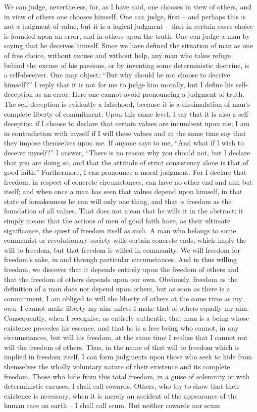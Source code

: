 \documentclass[12pt]{article}
\begin{document}
We can judge, nevertheless, for, as I have said, one chooses in view of others, and in view of others one chooses himself. One can judge, first – and perhaps this is not a judgment of value, but it is a logical judgment – that in certain cases choice is founded upon an error, and in others upon the truth. One can judge a man by saying that he deceives himself. Since we have defined the situation of man as one of free choice, without excuse and without help, any man who takes refuge behind the excuse of his passions, or by inventing some deterministic doctrine, is a self-deceiver. One may object: “But why should he not choose to deceive himself?” I reply that it is not for me to judge him morally, but I define his self-deception as an error. Here one cannot avoid pronouncing a judgment of truth. The self-deception is evidently a falsehood, because it is a dissimulation of man’s complete liberty of commitment. Upon this same level, I say that it is also a self-deception if I choose to declare that certain values are incumbent upon me; I am in contradiction with myself if I will these values and at the same time say that they impose themselves upon me. If anyone says to me, “And what if I wish to deceive myself?” I answer, “There is no reason why you should not, but I declare that you are doing so, and that the attitude of strict consistency alone is that of good faith.” Furthermore, I can pronounce a moral judgment. For I declare that freedom, in respect of concrete circumstances, can have no other end and aim but itself; and when once a man has seen that values depend upon himself, in that state of forsakenness he can will only one thing, and that is freedom as the foundation of all values. That does not mean that he wills it in the abstract: it simply means that the actions of men of good faith have, as their ultimate significance, the quest of freedom itself as such. A man who belongs to some communist or revolutionary society wills certain concrete ends, which imply the will to freedom, but that freedom is willed in community. We will freedom for freedom’s sake, in and through particular circumstances. And in thus willing freedom, we discover that it depends entirely upon the freedom of others and that the freedom of others depends upon our own. Obviously, freedom as the definition of a man does not depend upon others, but as soon as there is a commitment, I am obliged to will the liberty of others at the same time as my own. I cannot make liberty my aim unless I make that of others equally my aim. Consequently, when I recognise, as entirely authentic, that man is a being whose existence precedes his essence, and that he is a free being who cannot, in any circumstances, but will his freedom, at the same time I realize that I cannot not will the freedom of others. Thus, in the name of that will to freedom which is implied in freedom itself, I can form judgments upon those who seek to hide from themselves the wholly voluntary nature of their existence and its complete freedom. Those who hide from this total freedom, in a guise of solemnity or with deterministic excuses, I shall call cowards. Others, who try to show that their existence is necessary, when it is merely an accident of the appearance of the human race on earth – I shall call scum. But neither cowards nor scum 
\end{document}
